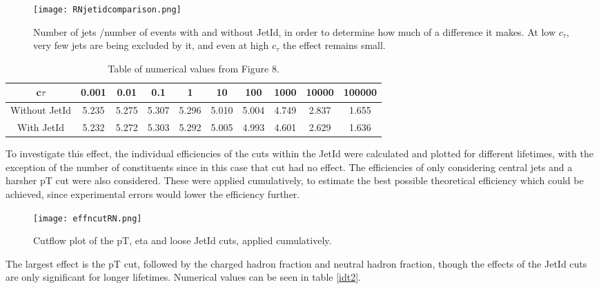 \documentclass{article}
\begin{document}
\begin{figure}[H]
\centering
\texttt{[image: RNjetidcomparison.png]}
\caption{Number of jets /number of events with and without JetId, in order to determine how much of a difference it makes. At low  $c_{\tau}$, very few jets are being excluded by it, and even at high  $c_{\tau}$ the effect remains small.}
	\label{id2}
\end{figure}

\begin{table}
\begin{center}
\begin{tabular}{ |c|c|c|c|c|c|c|c|c|c| } 
 \hline
 c$\tau$ &0.001 & 0.01 & 0.1 & 1 & 10 & 100 & 1000 & 10000 & 100000 \\ 
 \hline

Without JetId & 5.235& 5.275& 5.307& 5.296& 5.010&
 5.004& 4.749& 2.837& 1.655\\
 \hline
With JetId & 5.232& 5.272& 5.303& 5.292& 5.005& 4.993&
 4.601& 2.629& 1.636 \\
 \hline

\end{tabular}

\caption{Table of numerical values from Figure 8.}
	\label{idt1}
\end{center}
\end{table}

To investigate this effect, the individual efficiencies of the cuts within the JetId were calculated and plotted for different lifetimes, with the exception of the number of constituents since in this case that cut had no effect. The efficiencies of only considering central jets and a harsher pT cut were also considered. These were applied cumulatively, to estimate the best possible theoretical efficiency which could be achieved, since experimental errors would lower the efficiency further.

\begin{figure}[H]
\centering
\texttt{[image: effncutRN.png]}
\caption{Cutflow plot of the pT, eta and loose JetId cuts, applied cumulatively.}
\end{figure}

The largest effect is the pT cut, followed by the charged hadron fraction and neutral hadron fraction, though the effects of the JetId cuts are only significant for longer lifetimes. Numerical values can be seen in table \ref{idt2}. 
\end{document}
